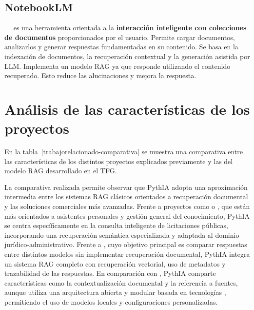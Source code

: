 \subsection{NotebookLM}
~\cite{trabajorelacionado:NotebookLM1}~\cite{trabajorelacionado:NotebookLM2} es una herramienta orientada a la \textbf{interacción inteligente con colecciones de documentos} proporcionados por el usuario. Permite cargar documentos, analizarlos y generar respuestas fundamentadas en su contenido. Se basa en la indexación de documentos, la recuperación contextual y la generación asistida por LLM. Implementa un modelo RAG ya que responde utilizando el contenido recuperado. Esto reduce las alucinaciones y mejora la respuesta. 

\section{Análisis de las características de los proyectos}
En la tabla~\ref{trabajorelacionado-comparativa} se muestra una comparativa entre las características de los distintos proyectos explicados previamente y las del modelo RAG desarrollado en el TFG. 

La comparativa realizada permite observar que PythIA adopta una aproximación intermedia entre los sistemas RAG clásicos orientados a recuperación documental y las soluciones comerciales más avanzadas. Frente a proyectos como  o , que están más orientados a asistentes personales y gestión general del conocimiento, PythIA se centra específicamente en la consulta inteligente de licitaciones públicas, incorporando una recuperación semántica especializada y adaptada al dominio jurídico-administrativo. Frente a , cuyo objetivo principal es comparar respuestas entre distintos modelos sin implementar recuperación documental, PythIA integra un sistema RAG completo con recuperación vectorial, uso de metadatos y trazabilidad de las respuestas. En comparación con , PythIA comparte características como la contextualización documental y la referencia a fuentes, aunque utiliza una arquitectura abierta y modular basada en tecnologías , permitiendo el uso de modelos locales y configuraciones personalizadas.

